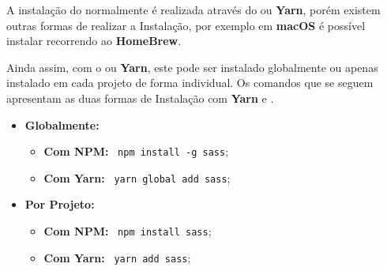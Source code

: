 
A instalação do \textbf{} normalmente é realizada através do \textbf{} ou \textbf{Yarn}, porém existem outras formas de realizar a Instalação, por exemplo em \textbf{macOS} é possível instalar recorrendo ao \textbf{HomeBrew}.

Ainda assim, com o \textbf{} ou \textbf{Yarn}, este pode ser instalado globalmente ou apenas instalado em cada projeto de forma individual. Os comandos que se seguem apresentam as duas formas de Instalação com \textbf{Yarn} e \textbf{}.

\begin{itemize}
	\item \textbf{Globalmente:}
	\begin{itemize}
		\item \textbf{Com NPM:} ~\verb|npm install -g sass|;
		\item \textbf{Com Yarn:} ~\verb|yarn global add sass|;
	\end{itemize}

	\item \textbf{Por Projeto:}
	\begin{itemize}
		\item \textbf{Com NPM:} ~\verb|npm install sass|;
		\item \textbf{Com Yarn:} ~\verb|yarn add sass|;
	\end{itemize}
\end{itemize}